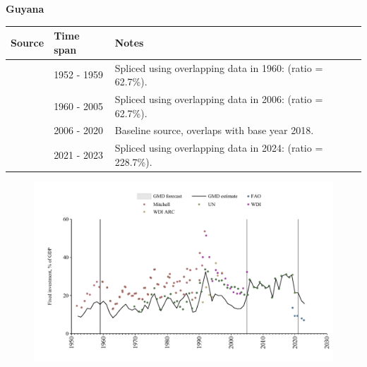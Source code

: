 \documentclass[12pt,a4paper,landscape]{article}
\begin{document}
\begin{adjustbox}{max totalsize={\paperwidth}{\paperheight},center}
\begin{minipage}[t][\textheight][t]{\textwidth}
\vspace*{0.5cm}
{}
\begin{center}
{\Large\bfseries Guyana}
\end{center}
\vspace{0.5cm}
\begin{table}[H]
\centering
\small
\begin{tabular}{|l|l|l|}
\hline
\textbf{Source} & \textbf{Time span} & \textbf{Notes} \\
\hline
\rowcolor{white}\cite{Mitchell}& 1952 - 1959 &Spliced using overlapping data in 1960: (ratio = 62.7\%).\\
\rowcolor{lightgray}\cite{WDI}& 1960 - 2005 &Spliced using overlapping data in 2006: (ratio = 62.7\%).\\
\rowcolor{white}\cite{UN}& 2006 - 2020 &Baseline source, overlaps with base year 2018.\\
\rowcolor{lightgray}\cite{FAO}& 2021 - 2023 &Spliced using overlapping data in 2024: (ratio = 228.7\%).\\
\hline
\end{tabular}
\end{table}
\begin{figure}[H]
\centering
\includegraphics[width=\textwidth,height=0.6\textheight,keepaspectratio]{graphs/GUY_finv_GDP.pdf}
\end{figure}
\end{minipage}
\end{adjustbox}
\end{document}
